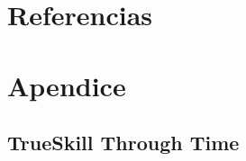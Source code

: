 \documentclass[a4paper,11pt]{book}
\makeatletter
\renewcommand{\frontmatter}{\cleardoublepage\@mainmatterfalse}
\theoremstyle{definition}
\newif\ifen
\newif\ifes
\newcommand{\en}[1]{\ifen#1\fi}
\newcommand{\es}[1]{\ifes#1\fi}
\makeatother
\begin{document}
%
%
%
%
%
%
%
%
%
%
%
%
%
%




































\frontmatter
\chapter{Referencias}





\chapter{Apendice} \label{app:technical}

\section{TrueSkill Through Time}

\subsection{\en{Skill evolution}}\label{sec:appendix_skill_evolution}
\end{document}
